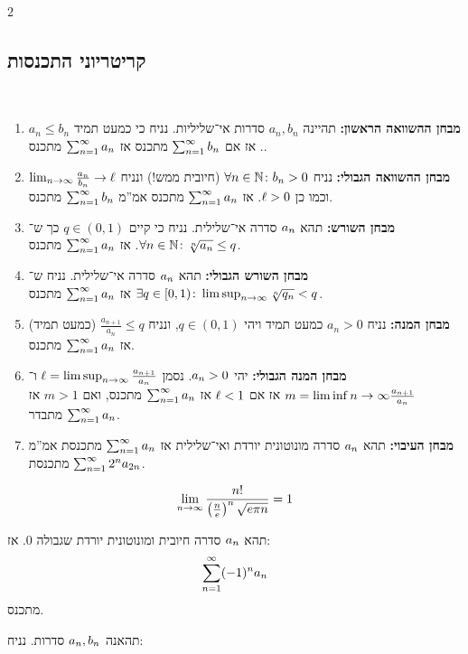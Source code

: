 \documentclass[]{../../../tex/classes/styledArticle}
\begin{document}
\begin{multicols}{2}
		\subsection{קריטריוני התכנסות}
		\begin{Theorem}\,
			\begin{enumerate}
				\item \textbf{מבחן ההשוואה הראשון: }תהיינה $a_n, b_n$ סדרות אי־שליליות. נניח כי כמעט תמיד $a_n \le b_n$. אז אם $\sum_{n = 1}^{\infty} b_n$ מתכנס אז $\sum_{n = 1}^{\infty} a_n$ מתכנס.		
				\item \textbf{מבחן ההשוואה הגבולי: }נניח $\forall n \in \mathbb{N}\colon b_n > 0$ (חיובית ממש!) ונניח $\lim_{n \to \infty} \frac{a_n}{b_n} \to \ell$ וכמו כן $\ell > 0$. אז $\sum_{n = 1}^{\infty} a_n$ מתכנס אמ''מ $\sum_{n = 1}^{\infty} b_n$ מתכנס. 
				\item \textbf{מבחן השורש: }תהא $a_n$ סדרה אי־שלילית. נניח כי קיים $q \in (0, 1)$ כך ש־$\forall n \in \mathbb{N} \colon \sqrt[n]{a_n} \le q$. אז $\sum_{n = 1}^{\infty} a_n$ מתכנס.
				\item \textbf{מבחן השורש הגבולי: }תהא $a_n$ סדרה אי־שלילית. נניח ש־$\exists q \in [0, 1) \colon \limsup_{n \to \infty} \sqrt[n]{q_n} < q$ אז $\sum_{n = 1}^{\infty} a_n$ מתכנס.
				\item \textbf{מבחן המנה: }נניח $a_n > 0$ כמעט תמיד ויהי $q \in (0, 1)$, ונניח $\frac{a_{n + 1}}{a_n} \le q$ (כמעט תמיד) אז $\sum_{n = 1}^{\infty} a_n$ מתכנס.
				\item \textbf{מבחן המנה הגבולי: }יהי $a_n > 0$. נסמן $\ell = \limsup_{n \to \infty} \frac{a_{n + 1}}{a_n}$ ו־$m = \liminf{n \to \infty} \frac{a_{n + 1}}{a_n}$ אז אם $\ell < 1$ אז $\sum_{n = 1}^{\infty} a_n$ מתכנס, ואם $m > 1$ אז $\sum_{n = 1}^{\infty} a_n$ מתבדר. 
				\item \textbf{מבחן העיבוי: }תהא $a_n$ סדרה מונוטונית יורדת ואי־שלילית אז $\sum_{n = 1}^{\infty} a_n$ מתכנסת אמ''מ $\sum_{n = 1}^{\infty} 2^{n}a_{2n}$ מתכנסת.
			\end{enumerate}
		\end{Theorem}
		\begin{Theorem}
			\[ \lim_{n \to \infty} \frac{n!}{\left ( \frac{n}{e} \right )^{n}\sqrt{e \pi n}} = 1 \]
		\end{Theorem}
		\begin{Theorem}
			תהא $a_n$ סדרה חיובית ומונוטונית יורדת שגבולה $0$. אז:
			\[ \sum_{n = 1}^{\infty} (-1)^{n}a_n \]
			מתכנס.
		\end{Theorem}
		\begin{Theorem}
			תהאנה $a_n, b_n$ סדרות. נניח:
			\begin{enumerate}

\end{enumerate}
\end{Theorem}
\end{multicols}
\end{document}
